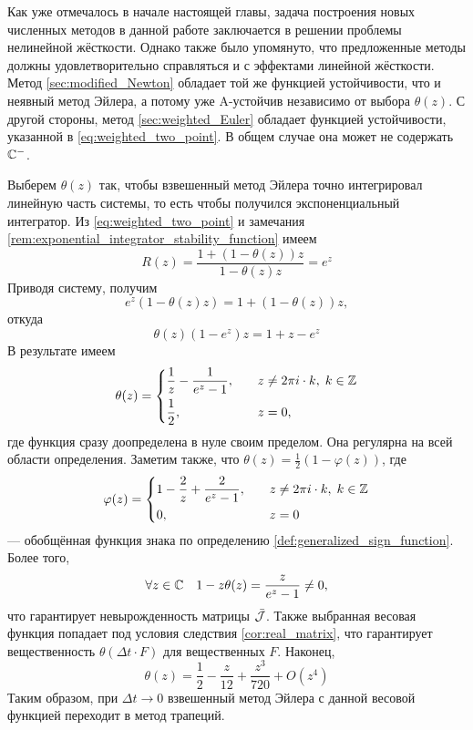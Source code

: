 Как уже отмечалось в начале настоящей главы,
задача построения новых численных методов в данной работе заключается в решении проблемы нелинейной жёсткости.
Однако также было упомянуто, что предложенные методы должны удовлетворительно справляться и с эффектами линейной жёсткости.
Метод \ref{sec:modified_Newton} обладает той же функцией устойчивости, что и неявный метод Эйлера,
а потому уже A-устойчив независимо от выбора $ \theta(z) $.
С другой стороны, метод \ref{sec:weighted_Euler} обладает функцией устойчивости,
указанной в \eqref{eq:weighted_two_point}.
В общем случае она может не содержать $ \mathbb{C}^- $.

Выберем $ \theta(z) $ так, чтобы взвешенный метод Эйлера точно интегрировал линейную часть системы,
то есть чтобы получился экспоненциальный интегратор.
Из \eqref{eq:weighted_two_point} и замечания \ref{rem:exponential_integrator_stability_function} имеем
\[
    R(z) = \frac{1 + (1 - \theta(z)) z}{1 - \theta(z) z} = e^z
\]
Приводя систему, получим
\[
    e^z (1 - \theta(z) z) = 1 + (1 - \theta(z)) z,
\]
откуда
\[
    \theta(z) \left( 1 - e^z \right) z = 1 + z - e^z
\]
В результате имеем
\begin{equation}
    \label{eq:exponential_integrator_weight}
    \theta(z) =
    \begin{dcases}
        \frac{1}{z} - \frac{1}{e^z - 1}, &\quad z \neq 2 \pi i \cdot k, \; k \in \mathbb{Z} \\
        \frac{1}{2}, &\quad z = 0,
    \end{dcases}
\end{equation}
где функция сразу доопределена в нуле своим пределом.
Она регулярна на всей области определения.
Заметим также, что $ \theta(z) = \frac{1}{2} (1 - \varphi(z)) $, где
\begin{equation}
    \label{eq:exponential_integrator_sign}
    \varphi(z) =
    \begin{dcases}
        1 - \frac{2}{z} + \frac{2}{e^z - 1}, &\quad z \neq 2 \pi i \cdot k, \; k \in \mathbb{Z} \\
        0, &\quad z = 0
    \end{dcases}
\end{equation}
--- обобщённая функция знака по определению \ref{def:generalized_sign_function}.
Более того,
\[
    \forall z \in \mathbb{C} \quad 1 - z \theta(z) = \frac{z}{e^z - 1} \neq 0,
\]
что гарантирует невырожденность матрицы $ \bar{\mathcal{J}} $.
Также выбранная весовая функция попадает под условия следствия \ref{cor:real_matrix},
что гарантирует вещественность $ \theta(\Delta t \cdot F) $ для вещественных $ F $.
Наконец,
\begin{equation}
    \label{eq:exponential_integrator_weight_series}
    \theta(z) = \frac{1}{2} - \frac{z}{12} + \frac{z^3}{720} + O(z^4)
\end{equation}
Таким образом, при $ \Delta t \to 0 $ взвешенный метод Эйлера с данной весовой функцией переходит в метод трапеций.
